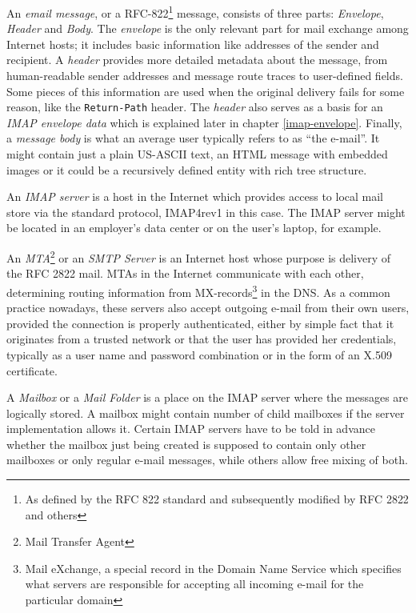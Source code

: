 \documentclass[12pt,notitlepage]{report}
\begin{document}
An {\em email message}, or a RFC-822\footnote{As defined by the RFC 822 standard
and subsequently modified by RFC 2822 \cite{rfc-2822} and others} message,
consists of three parts: {\em Envelope}, {\em Header} and {\em Body}. The {\em
envelope} is the only relevant part for mail exchange among Internet
hosts; it includes basic information like addresses of the sender and recipient.
A {\em header} provides more detailed metadata about the message, from
human-readable sender addresses and message route traces to user-defined
fields.  Some pieces of this information are used when the original delivery
fails for some reason, like the {\tt Return-Path} header.  The {\em header} also
serves as a basis for an {\em IMAP envelope data} which is explained later
in chapter \ref{imap-envelope}.  Finally, a {\em message body} is what an
average user typically refers to as ``the e-mail''.  It might contain just a
plain US-ASCII text, an HTML message with embedded images or it could be a
recursively defined entity with rich tree structure.

An {\em IMAP server} is a host in the Internet which provides access to local
mail store via the standard protocol, IMAP4rev1 in this case. The IMAP server
might be located in an employer's data center or on the user's laptop, for
example.

An {\em MTA}\footnote{Mail Transfer Agent} or an {\em SMTP Server} is an
Internet host whose purpose is delivery of the RFC 2822 mail.  MTAs in the
Internet communicate with each other, determining routing information from
MX-records\footnote{Mail eXchange, a special record in the Domain Name Service
which specifies what servers are responsible for accepting all incoming e-mail
for the particular domain} in the DNS.  As a common practice nowadays, these
servers also accept outgoing e-mail from their own users, provided the
connection is properly authenticated, either by simple fact that it originates
from a trusted network or that the user has provided her credentials, typically as
a user name and password combination or in the form of an X.509 certificate.

A {\em Mailbox} or a {\em Mail Folder} is a place on the IMAP server where the
messages are logically stored.  A mailbox might contain number of child
mailboxes if the server implementation allows it.  Certain IMAP servers have to
be told in advance whether the mailbox just being created is supposed to contain
only other mailboxes or only regular e-mail messages, while others allow free
mixing of both.
\end{document}
